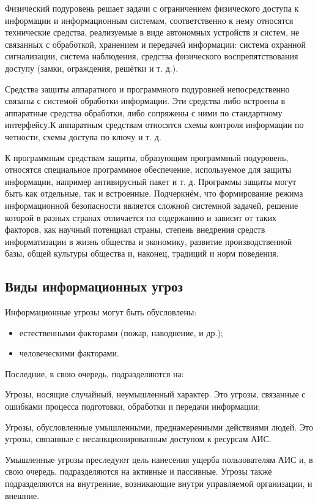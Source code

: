 Физический подуровень решает задачи с ограничением физического доступа к
информации и информационным системам, соответственно к нему относятся
технические средства, реализуемые в виде автономных устройств и систем, не
связанных с обработкой, хранением и передачей информации: система охранной
сигнализации, система наблюдения, средства физического воспрепятствования
доступу (замки, ограждения, решётки и т. д.).

Средства защиты аппаратного и программного подуровней непосредственно связаны
с системой обработки информации. Эти средства либо встроены в аппаратные
средства обработки, либо сопряжены с ними по стандартному интерфейсу.К
аппаратным средствам относятся схемы контроля информации по четности, схемы
доступа по ключу и т. д.

К программным средствам защиты, образующим программный подуровень, относятся
специальное программное обеспечение, используемое для защиты информации,
например антивирусный пакет и т. д. Программы защиты могут быть как
отдельные, так и встроенные. Подчеркнём, что формирование режима
информационной безопасности является сложной системной задачей, решение
которой в разных странах отличается по содержанию и зависит от таких
факторов, как научный потенциал страны, степень внедрения средств
информатизации в жизнь общества и экономику, развитие производственной базы,
общей культуры общества и, наконец, традиций и норм поведения.

\subsection{Виды информационных угроз}
\noindent Информационные угрозы могут быть обусловлены:
\begin{itemize}[noitemsep]
  \item естественными факторами (пожар, наводнение, и др.);
  \item человеческими факторами.
\end{itemize}
\noindent Последние, в свою очередь, подразделяются на:
\begin{Notes}
  \item Угрозы, носящие случайный, неумышленный характер. Это
      угрозы, связанные с ошибками процесса подготовки, обработки и
      передачи информации;
  \item Угрозы, обусловленные умышленными, преднамеренными
      действиями людей. Это угрозы, связанные с несанкционированным
      доступом к ресурсам АИС.
\end{Notes}
Умышленные угрозы преследуют цель нанесения ущерба пользователям АИС и, в
свою очередь, подразделяются на активные и пассивные. Угрозы также
подразделяются на внутренние, возникающие внутри управляемой организации, и
внешние.


